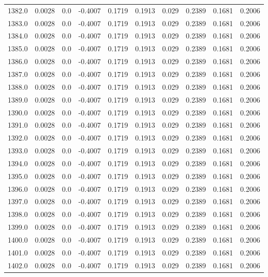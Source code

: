 \begin{longtable}{lrrrrrrrrr}
1382.0 & 0.0028 & 0.0 & -0.4007 & 0.1719 & 0.1913 & 0.029 & 0.2389 & 0.1681 & 0.2006 \\
1383.0 & 0.0028 & 0.0 & -0.4007 & 0.1719 & 0.1913 & 0.029 & 0.2389 & 0.1681 & 0.2006 \\
1384.0 & 0.0028 & 0.0 & -0.4007 & 0.1719 & 0.1913 & 0.029 & 0.2389 & 0.1681 & 0.2006 \\
1385.0 & 0.0028 & 0.0 & -0.4007 & 0.1719 & 0.1913 & 0.029 & 0.2389 & 0.1681 & 0.2006 \\
1386.0 & 0.0028 & 0.0 & -0.4007 & 0.1719 & 0.1913 & 0.029 & 0.2389 & 0.1681 & 0.2006 \\
1387.0 & 0.0028 & 0.0 & -0.4007 & 0.1719 & 0.1913 & 0.029 & 0.2389 & 0.1681 & 0.2006 \\
1388.0 & 0.0028 & 0.0 & -0.4007 & 0.1719 & 0.1913 & 0.029 & 0.2389 & 0.1681 & 0.2006 \\
1389.0 & 0.0028 & 0.0 & -0.4007 & 0.1719 & 0.1913 & 0.029 & 0.2389 & 0.1681 & 0.2006 \\
1390.0 & 0.0028 & 0.0 & -0.4007 & 0.1719 & 0.1913 & 0.029 & 0.2389 & 0.1681 & 0.2006 \\
1391.0 & 0.0028 & 0.0 & -0.4007 & 0.1719 & 0.1913 & 0.029 & 0.2389 & 0.1681 & 0.2006 \\
1392.0 & 0.0028 & 0.0 & -0.4007 & 0.1719 & 0.1913 & 0.029 & 0.2389 & 0.1681 & 0.2006 \\
1393.0 & 0.0028 & 0.0 & -0.4007 & 0.1719 & 0.1913 & 0.029 & 0.2389 & 0.1681 & 0.2006 \\
1394.0 & 0.0028 & 0.0 & -0.4007 & 0.1719 & 0.1913 & 0.029 & 0.2389 & 0.1681 & 0.2006 \\
1395.0 & 0.0028 & 0.0 & -0.4007 & 0.1719 & 0.1913 & 0.029 & 0.2389 & 0.1681 & 0.2006 \\
1396.0 & 0.0028 & 0.0 & -0.4007 & 0.1719 & 0.1913 & 0.029 & 0.2389 & 0.1681 & 0.2006 \\
1397.0 & 0.0028 & 0.0 & -0.4007 & 0.1719 & 0.1913 & 0.029 & 0.2389 & 0.1681 & 0.2006 \\
1398.0 & 0.0028 & 0.0 & -0.4007 & 0.1719 & 0.1913 & 0.029 & 0.2389 & 0.1681 & 0.2006 \\
1399.0 & 0.0028 & 0.0 & -0.4007 & 0.1719 & 0.1913 & 0.029 & 0.2389 & 0.1681 & 0.2006 \\
1400.0 & 0.0028 & 0.0 & -0.4007 & 0.1719 & 0.1913 & 0.029 & 0.2389 & 0.1681 & 0.2006 \\
1401.0 & 0.0028 & 0.0 & -0.4007 & 0.1719 & 0.1913 & 0.029 & 0.2389 & 0.1681 & 0.2006 \\
1402.0 & 0.0028 & 0.0 & -0.4007 & 0.1719 & 0.1913 & 0.029 & 0.2389 & 0.1681 & 0.2006 \\

\end{longtable}
